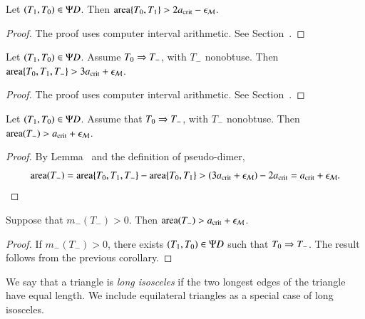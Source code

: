 \begin{lemma}
Let $(T_1,T_0)\in\Psi D$.  Then ${\operatorname{area}}\{T_0,T_1\} > 2a_\text{crit} - \epsilon_{\mathcal M}$.
\end{lemma}

\begin{proof} The proof uses computer interval arithmetic. See Section~.
\end{proof}

\begin{lemma}
Let $(T_1,T_0)\in\Psi D$. Assume $T_0\Rightarrow T_-$, with $T_-$ nonobtuse.
Then ${\operatorname{area}}\{T_0,T_1,T_-\} > 3a_\text{crit} + \epsilon_{\mathcal M}$.
\end{lemma}

\begin{proof} The proof uses computer interval arithmetic. See Section~.
\end{proof}

\begin{corollary} 
Let $(T_1,T_0)\in\Psi D$.  Assume that $T_0\Rightarrow T_-$, with $T_-$ nonobtuse.  Then
${\operatorname{area}}(T_-) > a_\text{crit}+\epsilon_{\mathcal M}$.
\end{corollary}

\begin{proof}  
  By Lemma~ and the definition of pseudo-dimer,
\[
{\operatorname{area}}(T_-) = {\operatorname{area}}\{T_0,T_1,T_-\} - {\operatorname{area}}\{T_0,T_1\} 
> (3a_\text{crit} + \epsilon_{\mathcal M}) - 2a_\text{crit} = a_\text{crit} + \epsilon_{\mathcal M}.
\]
\end{proof}

\begin{corollary}
  Suppose that $m_-(T_-)>0$.  Then ${\operatorname{area}}(T_-) > a_\text{crit} + \epsilon_{\mathcal M}$.
\end{corollary}

\begin{proof} 
  If $m_-(T_-)>0$, there exists $(T_1,T_0)\in\Psi D$ such that $T_0\Rightarrow
  T_-$.  The result follows from the previous corollary.
\end{proof}

\begin{definition}
  We say that a triangle is {\it long isosceles} if the two longest edges of
  the triangle have equal length.  We include equilateral triangles as
  a special case of long isosceles.
\end{definition}

